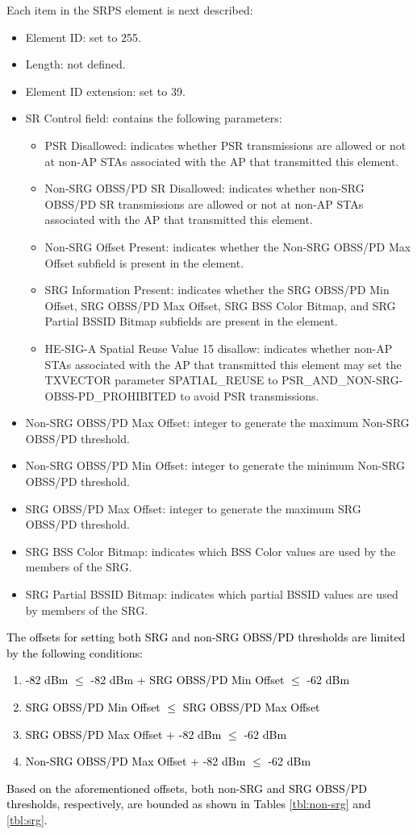 \documentclass[preprint,12pt]{elsarticle}
\theoremstyle{plain}
\begin{document}
Each item in the SRPS element is next described:
\begin{itemize}
	\item Element ID: set to 255.
	\item Length: not defined.
	\item Element ID extension: set to 39.
	\item SR Control field: contains the following parameters:
	\begin{itemize}
		\item PSR Disallowed: indicates whether PSR transmissions are allowed or not at non-AP STAs associated with the AP that transmitted this element.
		\item Non-SRG OBSS/PD SR Disallowed: indicates whether non-SRG OBSS/PD SR transmissions are allowed or not at non-AP STAs associated with the AP that transmitted this element.
		\item Non-SRG Offset Present: indicates whether the Non-SRG OBSS/PD Max Offset subfield is present in the element.
		\item SRG Information Present: indicates whether the SRG OBSS/PD Min Offset, SRG OBSS/PD Max Offset, SRG BSS Color Bitmap, and SRG Partial BSSID Bitmap subfields are present in the element.
		\item HE-SIG-A Spatial Reuse Value 15 disallow: indicates whether non-AP STAs associated with the AP that transmitted this element may set the TXVECTOR parameter SPATIAL\_REUSE to PSR\_AND\_NON-SRG-OBSS-PD\_PROHIBITED to avoid PSR transmissions.
	\end{itemize}
	\item Non-SRG OBSS/PD Max Offset: integer to generate the maximum Non-SRG OBSS/PD threshold.
	\item Non-SRG OBSS/PD Min Offset: integer to generate the minimum Non-SRG OBSS/PD threshold.
	\item SRG OBSS/PD Max Offset: integer to generate the maximum SRG OBSS/PD threshold.
	\item SRG BSS Color Bitmap: indicates which BSS Color values are used by the members of the SRG.
	\item SRG Partial BSSID Bitmap: indicates which partial BSSID values are used by members of the SRG.
\end{itemize}

\textcolor{black}{The offsets for setting both SRG and non-SRG OBSS/PD thresholds are limited by the following conditions:
\begin{enumerate}
	\item -82 dBm $\leq$ -82 dBm + SRG OBSS/PD Min Offset $\leq$ -62 dBm 
	\item SRG OBSS/PD Min Offset $\leq$ SRG OBSS/PD Max Offset
	\item SRG OBSS/PD Max Offset + -82 dBm $\leq$ -62 dBm 
	\item Non-SRG OBSS/PD Max Offset + -82 dBm $\leq$  -62 dBm
\end{enumerate}
Based on the aforementioned offsets, both non-SRG and SRG OBSS/PD thresholds, respectively, are bounded as shown in Tables \ref{tbl:non-srg} and \ref{tbl:srg}.}
\end{document}
